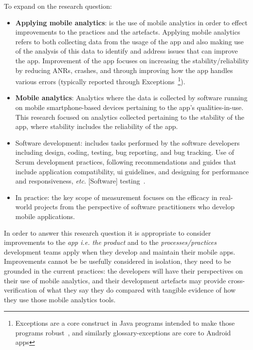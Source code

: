 To expand on the research question:
\begin{itemize}
    \item \textbf{Applying mobile analytics}: is the use of mobile analytics in order to effect improvements to the practices and the artefacts. Applying mobile analytics refers to both collecting data from the usage of the app and also making use of the analysis of this data to identify and address issues that can improve the app. Improvement of the app focuses on increasing the stability/reliability by reducing ANRs, crashes, and through improving how the app handles various errors (typically reported through Exceptions~\footnote{Exceptions are a core construct in Java programs intended to make those programs robust~\cite{robillard2000_designing_robust_java_programs_with_exceptions}, and similarly \glspl{glossary-exception} are core to Android apps}).
    \item \textbf{Mobile analytics}: Analytics where the data is collected by software running on mobile smartphone-based devices pertaining to the app's qualities-in-use. This research focused on analytics collected pertaining to the stability of the app, where stability includes the reliability of the app.
    \item Software development: includes tasks performed by the software developers including design, coding, testing, bug reporting, and bug tracking.  Use of Scrum development practices, following recommendations and guides that include application compatibility, \gls{ui} guidelines, and designing for performance and responsiveness, \emph{etc}. [Software] testing~.~
    \item In practice: the key scope of measurement focuses on the efficacy in real-world projects from the perspective of software practitioners who develop mobile applications.
\end{itemize}

In order to answer this research question it is appropriate to consider improvements to the \emph{app i.e. the product} and to the \emph{processes/practices} development teams apply when they develop and maintain their mobile apps. Improvements cannot be be usefully considered in isolation, they need to be grounded in the current practices: the developers will have their perspectives on their use of mobile analytics, and their development artefacts may provide cross-verification of what they say they do compared with tangible evidence of how they use those mobile analytics tools. 

